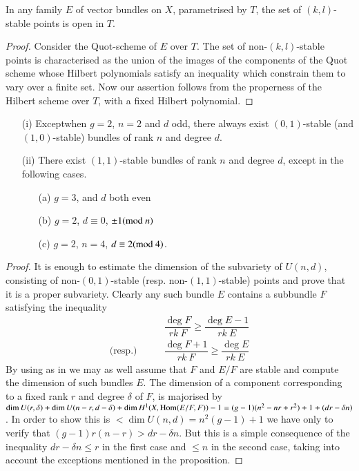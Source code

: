 \begin{subprop}\label{art05-prop5.3}
In any family $E$ of vector bundles on $X$, para\-metrised by $T$, the
set of $(k,l)$-stable points is open in $T$.
\end{subprop}

\begin{proof}
Consider the Quot-scheme of $E$ over $T$. The set of
non-$(k,l)$-stable points is characterised as the union of the images
of the components of the Quot scheme whose Hilbert polynomials satisfy
an inequality which constrain them to vary over a finite set. Now our
assertion follows from the properness of the Hilbert scheme over $T$,
with a fixed Hilbert polynomial.
\end{proof}

\begin{subprop}\label{art05-prop5.4}
\begin{itemize}
\item[\rm(i)] Except\pageoriginale when $g=2$, $n=2$ and $d$ odd,
there always exist 
$(0,1)$-stable (and $(1,0)$-stable) bundles of rank $n$ and degree
$d$.

\item[\rm(ii)] There exist $(1,1)$-stable bundles of rank $n$ and
degree $d$, except in the following cases.
\begin{itemize}
\item[\rm(a)] $g=3$, and $d$ both even

\item[\rm(b)] $g=2$, $d\equiv 0$, $\pm 1(\text{\rm mod~}n)$

\item[\rm(c)] $g=2$, $n=4$, $d\equiv 2(\text{\rm mod~}4)$.
\end{itemize}
\end{itemize}
\end{subprop}

\begin{proof}
It is enough to estimate the dimension of the subvariety of $U(n,d)$,
consisting of non-$(0,1)$-stable (resp. non-$(1,1)$-stable) points and
prove that it is a proper subvariety. Clearly any such bundle $E$
contains a subbundle $F$ satisfying the inequality  
\begin{align*}
& \dfrac{\deg F}{rk\ F}\geq \dfrac{\deg E-1}{rk\ E}\\
\text{(resp.)}\qquad & \dfrac{\deg F+1}{rk\ F}\geq \dfrac{\deg E}{rk\ E}
\end{align*}
By using \cite[Proposition 2.6]{art05-key5} as in \cite[Lemma
6.7]{art05-key5} we may as well assume that $F$ and $E/F$ are stable
and compute the dimension of such bundles $E$. The dimension of a
component corresponding to a fixed rank $r$ and degree $\delta$ of
$F$, is majorised by $\dim U(r,\delta)+\dim U(n-r, d-\delta)+\dim
H^{1}(X,\operatorname{Hom}(E/F,F))-1=(g-1)(n^{2}-nr+r^{2})+1+(dr-\delta n)$. In
order to show this is $<\dim U(n,d)=n^{2}(g-1)+1$ we have only to
verify that $(g-1)r(n-r)>dr-\delta n$. But this is a simple
consequence of the inequality $dr-\delta n\leq r$ in the first case
and $\leq n$ in the second case, taking into account the exceptions
mentioned in the proposition.
\end{proof}

